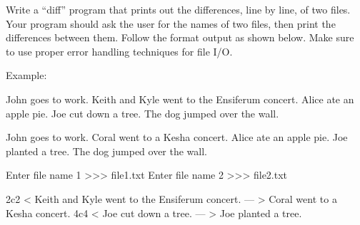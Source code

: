 \documentclass[11pt]{cselabheader}
\begin{document}
\begin{ex}[diff.py]
  Write a ``diff'' program that prints out the differences, line by line, of
  two files.  Your program should ask the user for the names of two files,
  then print the differences between them.  Follow the format output as shown
  below. Make sure to use proper error handling techniques for file I/O.

  Example:

  \begin{listing}[H]
    \vspace{-0.5em}
    \begin{verbatimcode}
John goes to work.
Keith and Kyle went to the Ensiferum concert.
Alice ate an apple pie.
Joe cut down a tree.
The dog jumped over the wall.
    \end{verbatimcode}
    \vspace{-0.5em}
    \caption{file1.txt}
    \vspace{-0.5em}
  \end{listing}

  \begin{listing}[H]
    \vspace{-0.5em}
    \begin{verbatimcode}
John goes to work.
Coral went to a Kesha concert.
Alice ate an apple pie.
Joe planted a tree.
The dog jumped over the wall.
    \end{verbatimcode}
    \vspace{-0.5em}
    \caption{file2.txt}
    \vspace{-0.5em}
  \end{listing}

  \begin{verbatimcode}
Enter file name 1 >>> file1.txt
Enter file name 2 >>> file2.txt

2c2
< Keith and Kyle went to the Ensiferum concert.
---
> Coral went to a Kesha concert.
4c4
< Joe cut down a tree.
---
> Joe planted a tree.
  \end{verbatimcode}
\end{ex}
\end{document}
